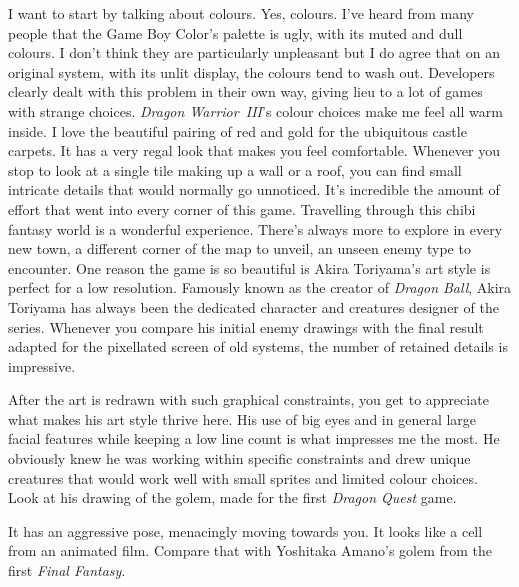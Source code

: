 \documentclass{book}
\begin{document}
I want to start by talking about colours. Yes, colours. I’ve heard from many people that the Game Boy Color’s palette is ugly, with its muted and dull colours. I don’t think they are particularly unpleasant but I do agree that on an original system, with its unlit display, the colours tend to wash out. Developers clearly dealt with this problem in their own way, giving lieu to a lot of games with strange choices. \emph{Dragon Warrior~III}’s colour choices make me feel all warm inside. I love the beautiful pairing of red and gold for the ubiquitous castle carpets. It has a very regal look that makes you feel comfortable. Whenever you stop to look at a single tile making up a wall or a roof, you can find small intricate details that would normally go unnoticed. It’s incredible the amount of effort that went into every corner of this game. Travelling through this chibi fantasy world is a wonderful experience. There’s always more to explore in every new town, a different corner of the map to unveil, an unseen enemy type to encounter. One reason the game is so beautiful is Akira Toriyama’s art style is perfect for a low resolution. Famously known as the creator of \emph{Dragon Ball}, Akira Toriyama has always been the dedicated character and creatures designer of the series. Whenever you compare his initial enemy drawings with the final result adapted for the pixellated screen of old systems, the number of retained details is impressive.\par
After the art is redrawn with such graphical constraints, you get to appreciate what makes his art style thrive here. His use of big eyes and in general large facial features while keeping a low line count is what impresses me the most. He obviously knew he was working within specific constraints and drew unique creatures that would work well with small sprites and limited colour choices. Look at his drawing of the golem, made for the first \emph{Dragon Quest} game.\par
\FloatBarrier\vspace{\baselineskip}\begin{figure}[H]\end{figure}
It has an aggressive pose, menacingly moving towards you. It looks like a cell from an animated film. Compare that with Yoshitaka Amano’s golem from the first \emph{Final Fantasy}.\par
\FloatBarrier\vspace{\baselineskip}\begin{figure}[H]\end{figure}
\end{document}
